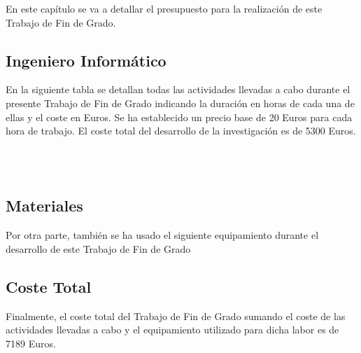 

En este capítulo se va a detallar el presupuesto para la realización de este Trabajo de Fin de Grado.

\subsection{Ingeniero Informático}

En la siguiente tabla se detallan todas las actividades llevadas a cabo durante el presente Trabajo de Fin de Grado indicando la duración en horas de cada una de ellas y el coste en Euros. 
Se ha establecido un precio base de 20 Euros para cada hora de trabajo. El coste total del desarrollo de la investigación es de 5300 Euros.


\\
\bigskip    
\\

\subsection{Materiales}
Por otra parte, también se ha usado el siguiente equipamiento durante el desarrollo de este Trabajo de Fin de Grado




\subsection{Coste Total}
Finalmente, el coste total del Trabajo de Fin de Grado sumando el coste de las actividades llevadas a cabo y el equipamiento utilizado para dicha labor es de 7189 Euros.